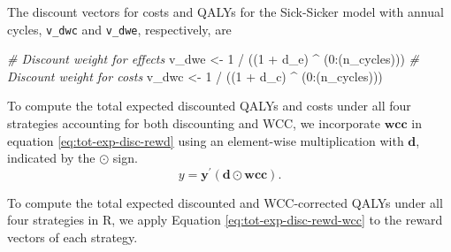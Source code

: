 \documentclass[
]{article}
\newenvironment{Shaded}{\begin{snugshade}}{\end{snugshade}}
\newcommand{\CommentTok}[1]{\textcolor[rgb]{0.56,0.35,0.01}{\textit{#1}}}
\newcommand{\DecValTok}[1]{\textcolor[rgb]{0.00,0.00,0.81}{#1}}
\newcommand{\NormalTok}[1]{#1}
\newcommand{\OtherTok}[1]{\textcolor[rgb]{0.56,0.35,0.01}{#1}}
\newcommand{\SpecialCharTok}[1]{\textcolor[rgb]{0.00,0.00,0.00}{#1}}
\begin{document}
The discount vectors for costs and QALYs for the Sick-Sicker model with annual cycles, \texttt{v\_dwc} and \texttt{v\_dwe}, respectively, are

\begin{Shaded}
\begin{Highlighting}[]
\CommentTok{\# Discount weight for effects}
\NormalTok{v\_dwe }\OtherTok{\textless{}{-}} \DecValTok{1} \SpecialCharTok{/}\NormalTok{ ((}\DecValTok{1} \SpecialCharTok{+}\NormalTok{ d\_e) }\SpecialCharTok{\^{}}\NormalTok{ (}\DecValTok{0}\SpecialCharTok{:}\NormalTok{(n\_cycles)))  }
\CommentTok{\# Discount weight for costs }
\NormalTok{v\_dwc }\OtherTok{\textless{}{-}} \DecValTok{1} \SpecialCharTok{/}\NormalTok{ ((}\DecValTok{1} \SpecialCharTok{+}\NormalTok{ d\_c) }\SpecialCharTok{\^{}}\NormalTok{ (}\DecValTok{0}\SpecialCharTok{:}\NormalTok{(n\_cycles)))    }
\end{Highlighting}
\end{Shaded}

To compute the total expected discounted QALYs and costs under all four strategies accounting for both discounting and WCC, we incorporate \(\mathbf{wcc}\) in equation \eqref{eq:tot-exp-disc-rewd} using an element-wise multiplication with \(\mathbf{d}\), indicated by the \(\odot\) sign.
\begin{equation}
 y = \mathbf{y}^{'} \left(\mathbf{d} \odot \mathbf{wcc}\right).
 \label{eq:tot-exp-disc-rewd-wcc}
\end{equation}

To compute the total expected discounted and WCC-corrected QALYs under all four strategies in R, we apply Equation \eqref{eq:tot-exp-disc-rewd-wcc} to the reward vectors of each strategy.
\end{document}
